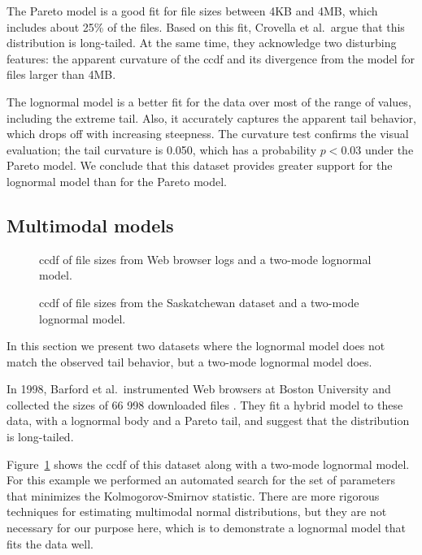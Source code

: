 \documentclass{elsart}
\begin{document}
The Pareto model is a good fit for file sizes between 4KB and 4MB,
which includes about 25\% of the files.
Based on this fit, Crovella et al.~argue that this distribution is
long-tailed.  At the same time, they acknowledge two disturbing
features: the apparent curvature of the ccdf and its divergence from
the model for files larger than 4MB.

The lognormal model is a better fit for the data over most of
the range of values, including the extreme tail.  Also, it accurately
captures the apparent tail behavior, which drops off with increasing
steepness.  The curvature
test confirms the visual evaluation; the tail curvature is
0.050, which has a probability $p < 0.03$ under the Pareto model.
We conclude that this dataset provides greater support for the
lognormal model than for the Pareto model.



\subsection {Multimodal models}

\begin{figure}[tb]
\centerline{}
\caption{
ccdf of file sizes from Web browser logs
and a two-mode lognormal model.}
\label{fig.w98}
\end{figure}

\begin{figure}[tb]
\centerline{}
\caption{
ccdf of file sizes from the Saskatchewan dataset
and a two-mode lognormal model.}
\label{fig.usask.mix}
\end{figure}

In this section we present two
datasets where the lognormal model does not match the
observed tail behavior, but a two-mode lognormal model does.

In 1998, Barford et al.~instrumented Web browsers at Boston University
and collected the sizes of 66 998 downloaded files
\cite{BarfordBestavrosBradleyCrovella99}.  They fit a hybrid model to
these data, with a lognormal body and a Pareto tail, and suggest that
the distribution is long-tailed.

Figure~\ref{fig.w98} shows the ccdf of this dataset along with
a two-mode lognormal model.
For this example we performed an automated search for the set of
parameters that minimizes the Kolmogorov-Smirnov statistic.  There
are more rigorous techniques for estimating multimodal normal
distributions, but they are not necessary for our purpose here, which
is to demonstrate a lognormal model that fits the data well.
\end{document}
